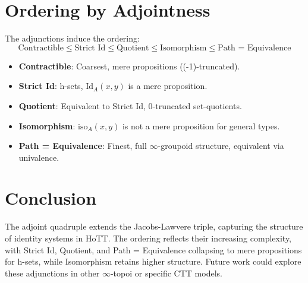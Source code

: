 \documentclass{article}
\theoremstyle{definition}
\begin{document}
\section{Ordering by Adjointness}
The adjunctions induce the ordering:
\[
\text{Contractible} \leq \text{Strict Id} \leq \text{Quotient} \leq \text{Isomorphism} \leq \text{Path = Equivalence}
\]
\begin{itemize}
    \item \textbf{Contractible}: Coarsest, mere propositions ((-1)-truncated).
    \item \textbf{Strict Id}: h-sets, $\text{Id}_A(x,y)$ is a mere proposition.
    \item \textbf{Quotient}: Equivalent to Strict Id, 0-truncated set-quotients.
    \item \textbf{Isomorphism}: $\text{iso}_A(x,y)$ is not a mere proposition for general types.
    \item \textbf{Path = Equivalence}: Finest, full $\infty$-groupoid structure, equivalent via univalence.
\end{itemize}

\section{Conclusion}
The adjoint quadruple extends the Jacobs-Lawvere triple, capturing the structure of identity systems in HoTT. The ordering reflects their increasing complexity, with Strict Id, Quotient, and Path = Equivalence collapsing to mere propositions for h-sets, while Isomorphism retains higher structure. Future work could explore these adjunctions in other $\infty$-topoi or specific CTT models.
\end{document}

